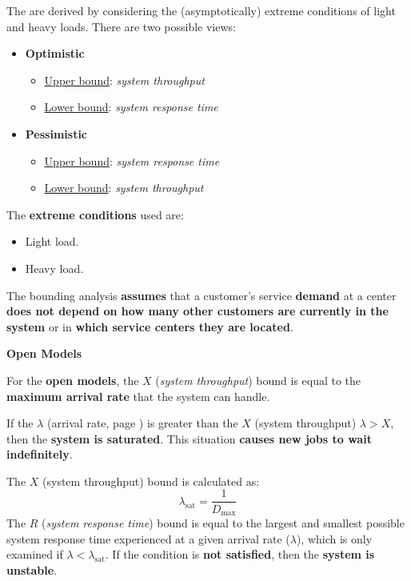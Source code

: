 The  are derived by considering the (asymptotically) extreme conditions of light and heavy loads. There are two possible views:
\begin{itemize}
	\item \textbf{Optimistic}
	\begin{itemize}
		\item \underline{Upper bound}: \emph{system throughput}
		\item \underline{Lower bound}: \emph{system response time}
	\end{itemize}
	
	\item \textbf{Pessimistic}
	\begin{itemize}
		\item \underline{Upper bound}: \emph{system response time}
		\item \underline{Lower bound}: \emph{system throughput}
	\end{itemize}
\end{itemize}
The \textbf{extreme conditions} used are:
\begin{itemize}
	\item Light load.
	\item Heavy load.
\end{itemize}
The bounding analysis \textbf{assumes} that a customer's service \textbf{demand} at a center \textbf{does not depend on how many other customers are currently in the system} or in \textbf{which service centers they are located}.

\highspace
\begin{flushleft}
	\textcolor{Red2}{\textbf{Open Models}}
\end{flushleft}
For the \textbf{open models}, the $X$ (\emph{system throughput}) bound is equal to the \textbf{maximum arrival rate} that the system can handle.

\highspace
If the $\lambda$ (arrival rate, page \pageref{eq: arrival rate}) is greater than the $X$ (system throughput) $\lambda > X$, then the \textbf{system is saturated}. This situation \textbf{causes new jobs to wait indefinitely}.

\highspace
The $X$ (system throughput) bound is calculated as:
\begin{equation}
	\lambda_{\text{sat}} = \dfrac{1}{D_{\max}}
\end{equation}
The $R$ (\emph{system response time}) bound is equal to the largest and smallest possible system response time experienced at a given arrival rate ($\lambda$), which is only examined if $\lambda < \lambda_{\text{sat}}$. If the condition is \textbf{not satisfied}, then the \textbf{system is unstable}.

